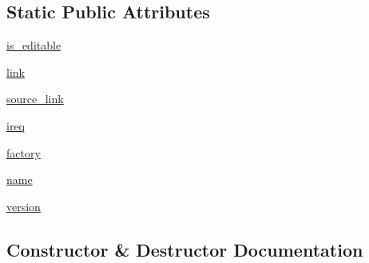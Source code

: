 \subsection*{Static Public Attributes}
\begin{DoxyCompactItemize}
\item 
\hyperlink{classpip_1_1__internal_1_1resolution_1_1resolvelib_1_1candidates_1_1EditableCandidate_a0a9fd93e80b14990b686ab110630359d}{is\+\_\+editable}
\item 
\hyperlink{classpip_1_1__internal_1_1resolution_1_1resolvelib_1_1candidates_1_1EditableCandidate_af4659e8702a9ea2b00fb131a05ac2a12}{link}
\item 
\hyperlink{classpip_1_1__internal_1_1resolution_1_1resolvelib_1_1candidates_1_1EditableCandidate_a9fa33c771530275a3c6bdab5f5bb6d75}{source\+\_\+link}
\item 
\hyperlink{classpip_1_1__internal_1_1resolution_1_1resolvelib_1_1candidates_1_1EditableCandidate_aa646a7d1c70df34801b0ac8ff0a41860}{ireq}
\item 
\hyperlink{classpip_1_1__internal_1_1resolution_1_1resolvelib_1_1candidates_1_1EditableCandidate_aa02a80544aaee462bab0c6e0b2b4b6cd}{factory}
\item 
\hyperlink{classpip_1_1__internal_1_1resolution_1_1resolvelib_1_1candidates_1_1EditableCandidate_a74b7ac5b5e355724b36529df65b907c7}{name}
\item 
\hyperlink{classpip_1_1__internal_1_1resolution_1_1resolvelib_1_1candidates_1_1EditableCandidate_a2011fe6a1910fce73bf7c89abf771523}{version}
\end{DoxyCompactItemize}


\subsection{Constructor \& Destructor Documentation}
\mbox{\label{classpip_1_1__internal_1_1resolution_1_1resolvelib_1_1candidates_1_1EditableCandidate_a98ffa2bdc92dc9724f75765230db0bcc}} 
